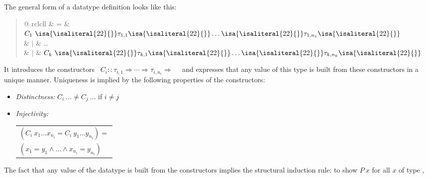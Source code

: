 \begin{isabellebody}
\begin{isamarkuptext}
The general form of a datatype definition looks like this:
\begin{quote}
\begin{tabular}{@ {}rclcll}
 
     & = & $C_1 \ \isa{{\isaliteral{22}{\isachardoublequote}}}\tau_{1,1}\isa{{\isaliteral{22}{\isachardoublequote}}} \dots \isa{{\isaliteral{22}{\isachardoublequote}}}\tau_{1,n_1}\isa{{\isaliteral{22}{\isachardoublequote}}}$ \\
     & $|$ & \dots \\
     & $|$ & $C_k \ \isa{{\isaliteral{22}{\isachardoublequote}}}\tau_{k,1}\isa{{\isaliteral{22}{\isachardoublequote}}} \dots \isa{{\isaliteral{22}{\isachardoublequote}}}\tau_{k,n_k}\isa{{\isaliteral{22}{\isachardoublequote}}}$
\end{tabular}
\end{quote}
It introduces the constructors \
$C_i :: \tau_{i,1}\Rightarrow \cdots \Rightarrow \tau_{i,n_i} \Rightarrow$~ \ and expresses that any value of this type is built from these constructors in a unique manner. Uniqueness is implied by the following
properties of the constructors:
\begin{itemize}
\item \emph{Distinctness:} $C_i\ \ldots \neq C_j\ \dots$ \quad if $i \neq j$
\item \emph{Injectivity:}
\begin{tabular}[t]{l}
 $(C_i \ x_1 \dots x_{n_i} = C_i \ y_1 \dots y_{n_i}) =$\\
 $(x_1 = y_1 \land \dots \land x_{n_i} = y_{n_i})$
\end{tabular}
\end{itemize}
The fact that any value of the datatype is built from the constructors implies
the structural induction rule: to show
$P~x$ for all $x$ of type ,

\end{isamarkuptext}
\end{isabellebody}

